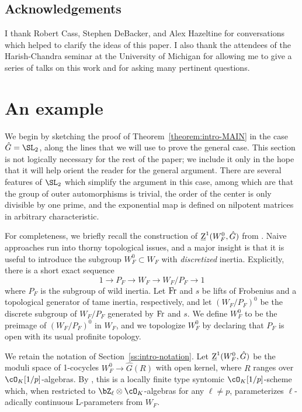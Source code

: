 \subsection{Acknowledgements}

I thank Robert Cass, Stephen DeBacker, and Alex Hazeltine for conversations which helped to clarify the ideas of this paper. I also thank the attendees of the Harish-Chandra seminar at the University of Michigan for allowing me to give a series of talks on this work and for asking many pertinent questions.











\section{An example}\label{section:example}

We begin by sketching the proof of Theorem~\ref{theorem:intro-MAIN} in the case $\hat{G} = \SL_2$, along the lines that we will use to prove the general case. This section is not logically necessary for the rest of the paper; we include it only in the hope that it will help orient the reader for the general argument. There are several features of $\SL_2$ which simplify the argument in this case, among which are that the group of outer automorphisms is trivial, the order of the center is only divisible by one prime, and the exponential map is defined on nilpotent matrices in arbitrary characteristic. \smallskip

For completeness, we briefly recall the construction of $\underline{\rm{Z}}^1(W_F^0, \hat{G})$ from \cite{DHKM}. Naive approaches run into thorny topological issues, and a major insight is that it is useful to introduce the subgroup $W_F^0 \subset W_F$ with \textit{discretized} inertia. Explicitly, there is a short exact sequence
\[
1 \to P_F \to W_F \to W_F/P_F \to 1
\]
where $P_F$ is the subgroup of wild inertia. Let $\rm{Fr}$ and $s$ be lifts of Frobenius and a topological generator of tame inertia, respectively, and let $(W_F/P_F)^0$ be the discrete subgroup of $W_F/P_F$ generated by $\rm{Fr}$ and $s$. We define $W_F^0$ to be the preimage of $(W_F/P_F)^0$ in $W_F$, and we topologize $W_F^0$ by declaring that $P_F$ is open with its usual profinite topology.\smallskip

We retain the notation of Section~\ref{ss:intro-notation}. Let $\underline{\rm{Z}}^1(W_F^0, \hat{G})$ be the moduli space of 1-cocycles $W_F^0 \to \hat{G}(R)$ with open kernel, where $R$ ranges over $\cO_K[1/p]$-algebras. By \cite[4.1]{DHKM}, this is a locally finite type syntomic $\cO_K[1/p]$-scheme which, when restricted to $\bZ_\ell \otimes \cO_K$-algebras for any $\ell \neq p$, parameterizes $\ell$-adically continuous L-parameters from $W_F$.\smallskip

